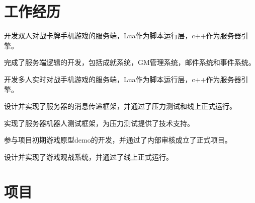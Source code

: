 \documentclass[]{deedy-resume-openfont}
\begin{document}
\begin{minipage}[t]{0.74\textwidth} 


\section{工作经历}

\vspace{\topsep}
\begin{tightemize}
    \item 开发双人对战卡牌手机游戏的服务端，Lua作为脚本运行层，c++作为服务器引擎。
    \item 完成了服务端逻辑的开发，包括成就系统，GM管理系统，邮件系统和事件系统。
\end{tightemize}
\sectionsep

\vspace{\topsep}
\begin{tightemize}
    \item 开发多人实时对战手机游戏的服务端，Lua作为脚本运行层，c++作为服务器引擎。
    \item 设计并实现了服务器的消息传递框架，并通过了压力测试和线上正式运行。
    \item 实现了服务器机器人测试框架，为压力测试提供了技术支持。
\end{tightemize}
\sectionsep

\vspace{\topsep}
\begin{tightemize}
    \item 参与项目初期游戏原型demo的开发，并通过了内部审核成立了正式项目。
    \item 设计并实现了游戏观战系统，并通过了线上正式运行。
\end{tightemize}
\sectionsep


\section{项目}


\end{minipage}
\end{document}
